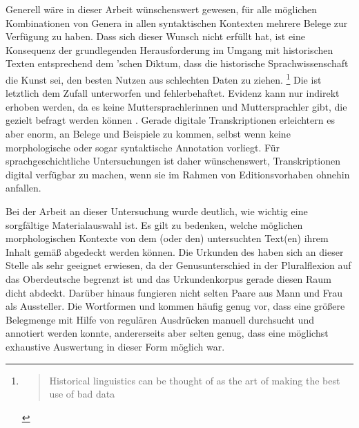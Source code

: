 Generell wäre in dieser Arbeit wünschenswert gewesen, für alle möglichen
Kombinationen von Genera in allen syntaktischen Kontexten mehrere
Belege zur Verfügung zu haben. Dass sich dieser Wunsch nicht erfüllt hat, ist
eine Konsequenz der grundlegenden Herausforderung im Umgang mit historischen
Texten entsprechend dem \citeauthor{labov1994}'schen Diktum, dass die
historische Sprachwissenschaft die Kunst sei, den besten Nutzen aus schlechten
Daten zu ziehen.%
%
	\footnote{\foreignblockcquote{english}[11]{labov1994}{Historical
		linguistics can \textelp{} be thought of as the art of making the best
		use of bad data}.%
	}
%
Die  ist letztlich dem Zufall unterworfen und
fehlerbehaftet. Evidenz kann nur indirekt erhoben werden, da es keine
Muttersprachlerinnen und Muttersprachler gibt, die gezielt befragt werden
können \autocite[11]{labov1994}. Gerade digitale
Transkriptionen erleichtern es aber enorm, an Belege und
Beispiele zu kommen, selbst wenn keine morphologische oder sogar syntaktische
Annotation vorliegt.
Für sprachgeschichtliche Untersuchungen ist daher
wünschenswert, Transkriptionen digital verfügbar zu machen, wenn sie im Rahmen
von Editionsvorhaben ohnehin anfallen.

Bei der Arbeit an dieser Untersuchung wurde deutlich, wie wichtig eine
sorgfältige Material\-auswahl ist. Es gilt zu bedenken, welche möglichen
morphologischen Kontexte von dem (oder den) untersuchten Text(en) ihrem Inhalt
gemäß abgedeckt werden können. Die Urkunden des \CAO{} haben sich
an dieser Stelle als sehr geeignet erwiesen, da der Genusunterschied in der
Pluralflexion auf das Oberdeutsche begrenzt ist und das
Urkundenkorpus gerade diesen Raum dicht abdeckt. Darüber
hinaus fungieren nicht selten Paare aus Mann und Frau als Aussteller. Die
Wortformen  und  kommen häufig genug vor, dass eine
größere Belegmenge mit Hilfe von regulären Ausdrücken
manuell durchsucht und annotiert werden konnte, andererseits aber selten genug,
dass eine möglichst exhaustive Auswertung in dieser Form möglich war.

